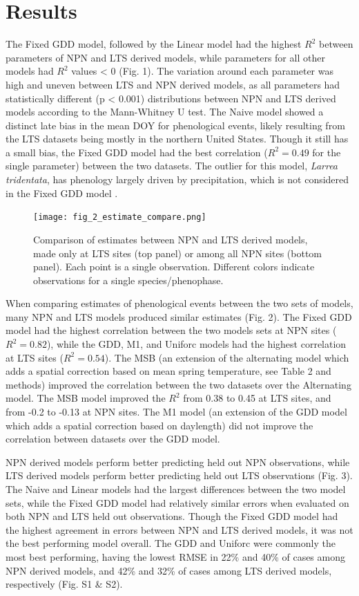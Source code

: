 \documentclass[fleqn,10pt,lineno]{wlpeerj} %
\begin{document}
\section*{Results}

The Fixed GDD model, followed by the Linear model had the highest $R^2$ between parameters of NPN and LTS derived models, while parameters for all other models had $R^2$ values < 0 (Fig. 1). The variation around each parameter was high and uneven between LTS and NPN derived models, as all parameters had statistically different (p < 0.001) distributions between NPN and LTS derived models according to the Mann-Whitney U test. The Naive model showed a distinct late bias in the mean DOY for phenological events, likely resulting from the LTS datasets being mostly in the northern United States. Though it still has a small bias, the Fixed GDD model had the best correlation ($R^2=0.49$ for the single parameter) between the two datasets. The outlier for this model, \textit{Larrea tridentata}, has phenology largely driven by precipitation, which is not considered in the Fixed GDD model \citep{beatley1974}. 

\begin{figure}
	\centering
		\texttt{[image: fig\_2\_estimate\_compare.png]}
	\caption{Comparison of estimates between NPN and LTS derived models, made only at LTS sites (top panel) or among all NPN sites (bottom panel). Each point is a single observation. Different colors indicate observations for a single species/phenophase.}
\end{figure}

When comparing estimates of phenological events between the two sets of models, many NPN and LTS models produced similar estimates (Fig. 2). The Fixed GDD model had the highest correlation between the two models sets at NPN sites ($R^2 = 0.82$), while the GDD, M1, and Uniforc models had the highest correlation at LTS sites ($R^2 = 0.54$). The MSB (an extension of the alternating model which adds a spatial correction based on mean spring temperature, see Table 2 and methods) improved the correlation between the two datasets over the Alternating model. The MSB model improved the $R^2$ from 0.38 to 0.45 at LTS sites, and from -0.2 to -0.13 at NPN sites. The M1 model (an extension of the GDD model which adds a spatial correction based on daylength) did not improve the correlation between datasets over the GDD model. 

NPN derived models perform better predicting held out NPN observations, while LTS derived models perform better predicting held out LTS observations (Fig. 3). The Naive and Linear models had the largest differences between the two model sets, while the Fixed GDD model had relatively similar errors when evaluated on both NPN and LTS held out observations. Though the Fixed GDD model had the highest agreement in errors between NPN and LTS derived models, it was not the best performing model overall. The GDD and Uniforc were commonly the most best performing, having the lowest RMSE in 22\% and 40\% of cases among NPN derived models, and 42\% and 32\% of cases among LTS derived models, respectively (Fig. S1 & S2).
\end{document}
